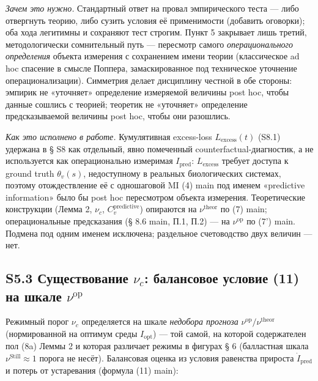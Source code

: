 \documentclass[pdflatex,sn-mathphys-ay]{sn-jnl}
\begin{document}
\emph{Зачем это нужно.} Стандартный ответ на провал эмпирического теста --- либо отвергнуть теорию, либо сузить условия её применимости (добавить оговорки); оба хода легитимны и сохраняют тест строгим. Пункт 5 закрывает лишь третий, методологически сомнительный путь --- пересмотр самого \emph{операционального определения} объекта измерения с сохранением имени теории (классическое ad hoc спасение в смысле Поппера, замаскированное под техническое уточнение операционализации). Симметрия делает дисциплину честной в обе стороны: эмпирик не «уточняет» определение измеряемой величины post hoc, чтобы данные сошлись с теорией; теоретик не «уточняет» определение предсказываемой величины post hoc, чтобы они разошлись.



\emph{Как это исполнено в работе.} Кумулятивная excess-loss \(L_{\text{excess}}(t)\) (S8.1) удержана в § S8 как отдельный, явно помеченный counterfactual-диагностик, а не используется как операционально измеримая \(I_{\text{pred}}\): \(L_{\text{excess}}\) требует доступа к ground truth \(\theta_v(s)\), недоступному в реальных биологических системах, поэтому отождествление её с одношаговой MI (4) main под именем «predictive information» было бы post hoc пересмотром объекта измерения. Теоретические конструкции (Лемма 2, \(\nu_c\), \(C_v^{\text{predictive}}\)) опираются на \(\nu^{\text{theor}}\) по (7) main; операциональные предсказания (§ 8.6 main, П.1, П.2) --- на \(\nu^{\text{op}}\) по (7') main. Подмена под одним именем исключена; раздельное счетоводство двух величин --- нет.



\subsection*{\texorpdfstring{S5.3 Существование \(\nu_c\): балансовое условие (11) на шкале \(\nu^{\text{op}}\)}{S5.3 Существование \textbackslash nu\_c: балансовое условие (11) на шкале \textbackslash nu\^{}\{\textbackslash text\{op\}\}}}\label{s5.3-ux441ux443ux449ux435ux441ux442ux432ux43eux432ux430ux43dux438ux435-nu_c-ux431ux430ux43bux430ux43dux441ux43eux432ux43eux435-ux443ux441ux43bux43eux432ux438ux435-11-ux43dux430-ux448ux43aux430ux43bux435-nutextop}



Режимный порог \(\nu_c\) определяется на шкале \emph{недобора прогноза} \(\nu^{\text{op}}/\nu^{\text{theor}}\) (нормированной на оптимум среды \(I_{\text{opt}}\)) --- той самой, на которой содержателен пол (8a) Леммы 2 и которая различает режимы в фигурах § 6 (балластная шкала \(\nu^{\text{Still}} \approx 1\) порога не несёт). Балансовая оценка из условия равенства прироста \(\dot{I}_{\text{pred}}\) и потерь от устаревания (формула (11) main):
\end{document}
